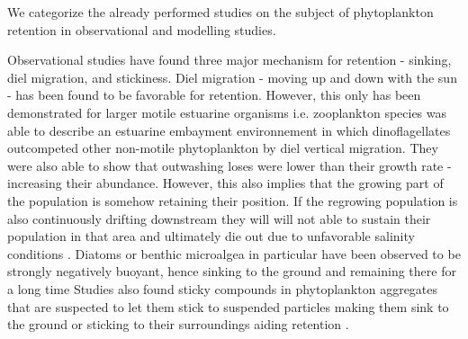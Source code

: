 \documentclass[npg, manuscript]{copernicus}
\begin{document}


We categorize the already performed studies on the subject of phytoplankton retention in observational and modelling studies.

Observational studies have found three major mechanism for retention - sinking, diel migration, and stickiness.
Diel migration - moving up and down with the sun - has been found to be favorable for retention.
However, this only has been demonstrated for larger motile estuarine organisms i.e. zooplankton species \citep{Hall2015,Kimmerer2002, Crawford1991}
\citep{Anderson1985} was able to describe an estuarine embayment environnement in which dinoflagellates outcompeted other non-motile phytoplankton by  diel vertical migration.
They were also able to show that outwashing loses were lower than their growth rate - increasing their abundance.
However, this also implies that the growing part of the population is somehow retaining their position.
If the regrowing population is also continuously drifting downstream they will will not able to sustain their population in that area and ultimately die out due to unfavorable salinity conditions \citep{Admiraal1976, vonAlvensleben2016, Jiang2020}.
Diatoms or benthic microalgea in particular have been observed to be strongly negatively buoyant, hence sinking to the ground and remaining there for a long time \citep{Passow1991}
Studies also found sticky compounds in phytoplankton aggregates that are suspected to let them stick to suspended particles making them sink to the ground or sticking to their surroundings aiding retention \citep{Kiørboe1993,VanderLee2000}.
\end{document}
